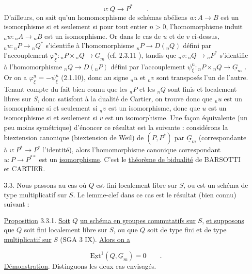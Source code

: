 \begin{equation*}
v : Q \longrightarrow P^* \qquad .
\end{equation*}
D'ailleurs, on sait qu'un homomorphisme de schémas abéliens $w : A \longrightarrow B$ est un isomorphisme si et seulement si pour tout entier $n > 0$, l'homomorphisme induit ${}_n w : {}_n A \longrightarrow {}_n B$ est un isomorphisme. Or dans le cas de $u$ et de $v$ ci-dessus, ${}_n u : {}_n P \longrightarrow {}_n Q^*$ s'identifie à l'homomorphisme ${}_n P \longrightarrow D({}_n Q)$ défini par l'accouplement $\varphi_\xi^n : {}_n P \times {}_n Q \longrightarrow \underline{G}_m$ (cf. 2.3.11 ), tandis que ${}_n v : {}_n Q \longrightarrow {}_n P^*$ s'identifie à l'homomorphisme ${}_n Q \longrightarrow D({}_n P)$ défini par l'accouplement $\psi_\xi^n : {}_n P \times {}_n Q \longrightarrow \underline{G}_m$ . Or on a $\varphi_\xi^n = - \psi_\xi^n$ (2.1.10), donc au signe ${}_n u$ et ${}_n v$ sont transposés l'un de l'autre. Tenant compte du fait bien connu que les ${}_n P$ et les ${}_n Q$ sont finis et localement libres sur $S$, donc satisfont à la dualité de Cartier, on trouve donc que ${}_n u$ est un isomorphisme si et seulement si ${}_n v$ est un isomorphisme, donc que $u$ est un isomorphisme si et seulement si $v$ est un isomorphisme. Une façon équivalente (un peu moins symétrique) d'énoncer ce résultat est la suivante : considérons la biextension canonique (biextension de Weil) de $(P,P^*)$ par $\underline{G}_m$ (correspondante à $v : P^* \longrightarrow P^*$ l'identité), alors l'homomorphisme canonique correspondant $u : P \longrightarrow P^{**}$ est un \underline{isomorphisme}. C'est le \underline{théorème de bidualité} de BARSOTTI et CARTIER.



3.3. Nous passons au cas où $Q$ est fini localement libre sur $S$, ou est un schéma de type multiplicatif sur $S$. Le lemme-clef dans ce cas est le résultat (bien connu) suivant :

\underline{Proposition} 3.3.1. \underline{Soit} $Q$ \underline{un schéma en groupes commutatifs sur} $S$, \underline{et supposons que} $Q$ \underline{soit fini localement libre sur} $S$, \underline{ou que} $Q$ \underline{soit de type fini et de type multiplicatif sur} $S$ (SGA 3 IX). \underline{Alors on a}

\begin{equation*}
\underline{\mathrm{Ext}}^1(Q,\underline{G}_m) = 0 \qquad .
\end{equation*}
\underline{Démonstration}. Distinguons les deux cas envisagés.

